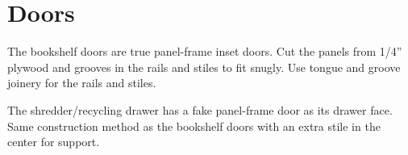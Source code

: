\section{Doors}

The bookshelf doors are true panel-frame inset doors. Cut the panels from 1/4'' plywood and grooves in the rails and stiles to fit snugly. Use tongue and groove joinery for the rails and stiles.

The shredder/recycling drawer has a fake panel-frame door as its drawer face. Same construction method as the bookshelf doors with an extra stile in the center for support.
